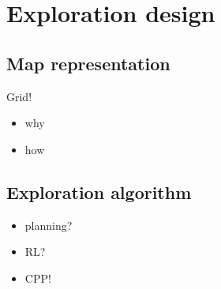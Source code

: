 \documentclass[buriama8_dp.tex]{subfiles}
\begin{document}
\chapter{Exploration design}

\section{Map representation}
Grid!
\begin{itemize}
\item why
\item how
\end{itemize}

\section{Exploration algorithm}

\begin{itemize}
\item planning?
\item RL?
\item CPP!
\end{itemize}
\end{document}
